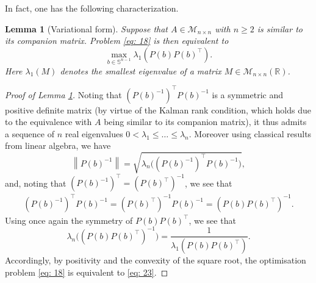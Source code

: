 \documentclass[11pt, a4paper, reqno]{amsart}
\newcommand{\R}{\mathbb{R}}
\theoremstyle{plain}
\numberwithin{equation}{section}
\newtheorem{lemma}{Lemma}[section]
\begin{document}
	In fact, one has the following characterization.
	
	\begin{lemma}[Variational form]
	\label{lem: spectral.reform}
	Suppose that $A\in\mathcal{M}_{n\times n}$ with $n\geqslant 2$ is similar to its companion matrix.
	Problem \eqref{eq: 18} is then equivalent to
	\begin{equation} \label{eq: 23}
	\boxed{
	\max_{b\in\mathbb{S}^{n-1}} \lambda_{1}\left(P(b)P(b)^\top\right).
	}
	\end{equation}
	Here $\lambda_{1}(M)$ denotes the smallest eigenvalue of a matrix $M\in\mathcal{M}_{n\times n}(\R)$.
	\end{lemma}
	
	\begin{proof}[Proof of Lemma \ref{lem: spectral.reform}]
	Noting that $(P(b)^{-1})^\top P(b)^{-1}$ is a symmetric and positive definite matrix (by virtue of the Kalman rank condition, which holds due to the equivalence with $A$ being similar to its companion matrix), it thus admits a sequence of  $n$ real eigenvalues $0 < \lambda_1 \leqslant \ldots \leqslant \lambda_n$. Moreover using classical results from linear algebra, we have
	\begin{equation} \label{eq: 2.26}
	\left\|P(b)^{-1}\right\| = \sqrt{\lambda_{n}\Big((P(b)^{-1})^\top P(b)^{-1}\Big)},
	\end{equation}
	and, noting that $\left(P(b)^{-1}\right)^\top = \left(P(b)^\top\right)^{-1}$, we see that
	\begin{align*}
	\left(P(b)^{-1}\right)^\top P(b)^{-1} = \left(P(b)^\top\right)^{-1} P(b)^{-1} = \left(P(b)P(b)^\top\right)^{-1}.
	\end{align*}
	Using once again the symmetry of $P(b)P(b)^\top$, we see that
	\begin{equation} \label{eq: 2.28}
	\lambda_{n}\Big((P(b)P(b)^\top)^{-1}\Big) = \frac{1}{\lambda_{1}(P(b)P(b)^\top)}.
	\end{equation}
	Accordingly, by positivity and the convexity of the square root, the optimisation problem \eqref{eq: 18} is equivalent to \eqref{eq: 23}.
	\end{proof}
	
\end{document}
